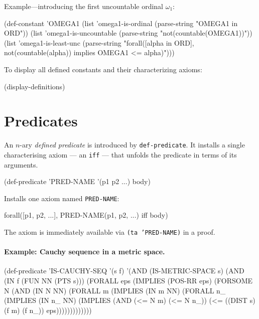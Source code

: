 Example---introducing the first uncountable ordinal $\omega_1$:
\begin{VNBcode}
(def-constant 'OMEGA1
  (list 'omega1-is-ordinal
        (parse-string "OMEGA1 in ORD"))
  (list 'omega1-is-uncountable
        (parse-string "not(countable(OMEGA1))"))
  (list 'omega1-is-least-unc
        (parse-string "forall([alpha in ORD],
          not(countable(alpha)) implies OMEGA1 <= alpha)")))
\end{VNBcode}

To display all defined constants and their characterizing axioms:
\begin{VNBcode}
(display-definitions)
\end{VNBcode}

\section{Predicates}
\label{sec:def-predicate}

An $n$-ary \emph{defined predicate} is introduced by \texttt{def-predicate}.
It installs a single characterising axiom --- an \texttt{iff} --- that
unfolds the predicate in terms of its arguments.

\begin{VNBcode}
(def-predicate 'PRED-NAME '(p1 p2 ...)  body)
\end{VNBcode}

Installs one axiom named \texttt{PRED-NAME}:
\begin{VNBsnip}
forall([p1, p2, ...], PRED-NAME(p1, p2, ...) iff body)
\end{VNBsnip}

The axiom is immediately available via \texttt{(ta 'PRED-NAME)} in a proof.

\paragraph{Example: Cauchy sequence in a metric space.}
\begin{VNBcode}
(def-predicate 'IS-CAUCHY-SEQ '(s f)
  '(AND (IS-METRIC-SPACE s)
   (AND (IN f (FUN NN (PTS s)))
        (FORALL eps (IMPLIES (POS-RR eps)
          (FORSOME N (AND (IN N NN)
            (FORALL m (IMPLIES (IN m NN)
              (FORALL n_ (IMPLIES (IN n_ NN)
                (IMPLIES (AND (<= N m) (<= N n_))
                  (<= ((DIST s) (f m) (f n_)) eps)))))))))))))
\end{VNBcode}

